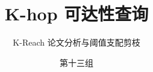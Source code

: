 \documentclass[aspectratio=169,12pt,fontset=none]{ctexbeamer}
\title[K-hop 可达性查询]{K-hop 可达性查询}
\subtitle{K-Reach 论文分析与阈值支配剪枝}
\author[第十三组]{第十三组}
\institute[]{《图数据管理与挖掘》课程期中汇报}
\date[]{}
\begin{document}
\begin{frame}
\titlepage
\end{frame}


\appendix

\end{document}
